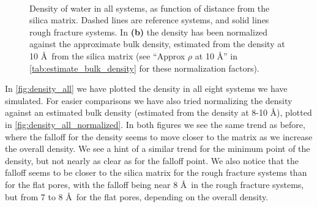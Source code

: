 \begin{figure}[!p]%
    \centering%
    \setlength{\myfigwidth}{0.88\textwidth}%
    \setlength{\mycaptionwidth}{0.09999\textwidth}%
    \begin{minipage}[c]{\myfigwidth}%
    \end{minipage}%
    \begin{minipage}[c]{\mycaptionwidth}%
        \subcaption{\label{fig:density_all}}%
    \end{minipage}%
    \\%
    \begin{minipage}[c]{\myfigwidth}%
    \end{minipage}%
    \begin{minipage}[c]{\mycaptionwidth}%
        \subcaption{\label{fig:density_all_normalized}}%
    \end{minipage}%
    \captionsetup{width=\textwidth}%
    \caption{%
        Density of water in all systems, as function of distance from the silica matrix. Dashed lines are reference systems, and solid lines rough fracture systems. In \textbf{(b)} the density has been normalized against the approximate bulk density, estimated from the density at 10 \AA\ from the silica matrix (see ``Approx $\rho$ at 10 \AA'' in \cref{tab:estimate_bulk_density} for these normalization factors). %
        \label{fig:last_density_fig}%
    }%
\end{figure}%

In \cref{fig:density_all} we have plotted the density in all eight systems we have simulated. For easier comparisons we have also tried normalizing the density against an estimated bulk density (estimated from the density at 8-10 \AA), plotted in \cref{fig:density_all_normalized}. In both figures we see the same trend as before, where the falloff for the density seems to move closer to the matrix as we increase the overall density. We see a hint of a similar trend for the minimum point of the density, but not nearly as clear as for the falloff point. We also notice that the falloff seems to be closer to the silica matrix for the rough fracture systems than for the flat pores, with the falloff being near 8 \AA\ in the rough fracture systems, but from 7 to 8 \AA\ for the flat pores, depending on the overall density.


